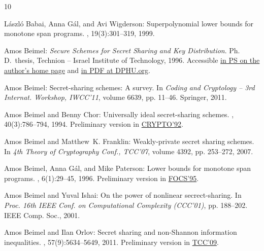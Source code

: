 \documentclass[11pt]{article}
\numberwithin{equation}{section}
\theoremstyle{definition}
\theoremstyle{plain}
\begin{document}
\tocrefpdfbookmark
\begin{thebibliography}{10}

{\sc L{\'{a}}szl{\'{o}} Babai, Anna G{\'{a}}l, and Avi Wigderson}:
  Superpolynomial lower bounds for monotone span programs.
, 19(3):301--319, 1999.
\newblock [\epfmtdoi{10.1007/s004930050058}]

{\sc Amos Beimel}: {\em Secure Schemes for Secret Sharing and Key
  Distribution}.
\newblock Ph.\,D.\ thesis, Technion -- Israel Institute of Technology, 1996.
\newblock Accessible \href{http://www.cs.bgu.ac.il/~beimel/Papers/thesis.ps}{in
  PS on the author's home page} and
  \href{https://dphu.org/uploads/attachements/books/books_1542_0.pdf}{in PDF at
  DPHU.org}.

{\sc Amos Beimel}: Secret-sharing schemes: {A} survey.
\newblock In {\em Coding and Cryptology -- 3rd Internat. Workshop, {IWCC'11}},
  volume 6639, pp. 11--46. Springer, 2011.
\newblock [\epfmtdoi{10.1007/978-3-642-20901-7\_2}]

{\sc Amos Beimel and Benny Chor}: Universally ideal secret-sharing schemes.
, 40(3):786--794, 1994.
\newblock Preliminary version in
  \href{https://doi.org/10.1007/3-540-48071-4\_13}{CRYPTO'92}.
\newblock [\epfmtdoi{10.1109/18.335890}]

{\sc Amos Beimel and Matthew~K. Franklin}: Weakly-private secret sharing
  schemes.
\newblock In {\em 4th Theory of Cryptography Conf., {TCC'07}}, volume 4392, pp.
  253--272, 2007.
\newblock [\epfmtdoi{10.1007/978-3-540-70936-7\_14}]

{\sc Amos Beimel, Anna G{\'{a}}l, and Mike Paterson}: Lower bounds for monotone
  span programs.
, 6(1):29--45, 1996.
\newblock Preliminary version in
  \href{https://doi.org/10.1109/SFCS.1995.492669}{FOCS'95}.
\newblock [\epfmtdoi{10.1007/BF01202040}]

{\sc Amos Beimel and Yuval Ishai}: On the power of nonlinear secrect-sharing.
\newblock In {\em Proc. 16th IEEE Conf. on Computational Complexity (CCC'01)},
  pp. 188--202. IEEE Comp. Soc., 2001.

{\sc Amos Beimel and Ilan Orlov}: Secret sharing and non-{S}hannon information
  inequalities.
, 57(9):5634--5649, 2011.
\newblock Preliminary version in
  \href{https://doi.org/10.1007/978-3-642-00457-5\_32}{TCC'09}.


\end{thebibliography}
\end{document}
